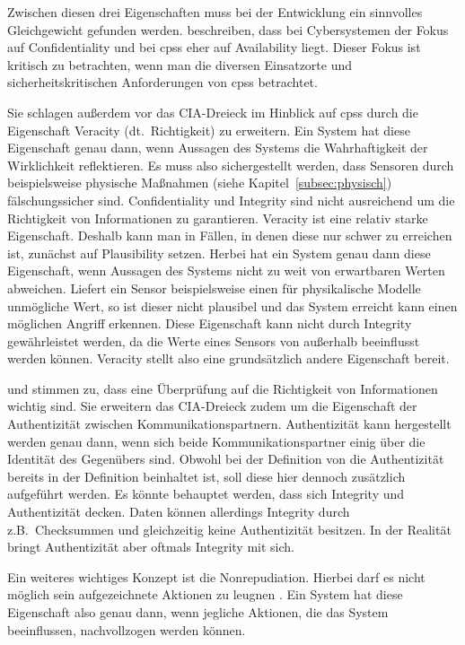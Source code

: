 \documentclass[final,bibliography=totocnumbered]{include/sikseminar}
\newcommand{\cps}{\glspl{cps}\xspace}
\begin{document}
Zwischen diesen drei Eigenschaften muss bei der Entwicklung ein sinnvolles Gleichgewicht gefunden werden.
\citeauthor{GK16} beschreiben, dass bei Cybersystemen der Fokus auf Confidentiality und bei \cps eher auf Availability liegt.
Dieser Fokus ist kritisch zu betrachten, wenn man die diversen Einsatzorte und sicherheitskritischen Anforderungen von \cps betrachtet.

Sie schlagen außerdem vor das CIA-Dreieck im Hinblick auf \cps durch die Eigenschaft Veracity (dt.~Richtigkeit) zu erweitern.
Ein System hat diese Eigenschaft genau dann, wenn Aussagen des Systems die Wahrhaftigkeit der  Wirklichkeit reflektieren.
Es muss also sichergestellt werden, dass Sensoren durch beispielsweise physische Maßnahmen (siehe Kapitel~\ref{subsec:physisch}) fälschungssicher sind.
Confidentiality und Integrity sind nicht ausreichend um die Richtigkeit von Informationen zu garantieren.
Veracity ist eine relativ starke Eigenschaft.
Deshalb kann man in Fällen, in denen diese nur schwer zu erreichen ist, zunächst auf Plausibility setzen.
Herbei hat ein System genau dann diese Eigenschaft, wenn Aussagen des Systems nicht zu weit von erwartbaren Werten abweichen.
Liefert ein Sensor beispielsweise einen für physikalische Modelle unmögliche Wert, so ist dieser nicht plausibel und das System erreicht kann einen möglichen Angriff erkennen. \cite{GK16}
Diese Eigenschaft kann nicht durch Integrity gewährleistet werden, da die Werte eines Sensors von außerhalb beeinflusst werden können.
Veracity stellt also eine grundsätzlich andere Eigenschaft bereit.

\citeauthor{WYX+10} und \citeauthor{SFJ2017} stimmen zu, dass eine Überprüfung auf die Richtigkeit von Informationen wichtig sind.
Sie erweitern das CIA-Dreieck zudem um die Eigenschaft der Authentizität zwischen Kommunikationspartnern.
Authentizität kann hergestellt werden genau dann, wenn sich beide Kommunikationspartner einig über die Identität des Gegenübers sind.\label{def:authenticity}
Obwohl bei der Definition von \citeauthor{Cherdantseva2013} die Authentizität bereits in der Definition beinhaltet ist, soll diese hier dennoch zusätzlich aufgeführt werden.
Es könnte behauptet werden, dass sich Integrity und Authentizität decken.
Daten können allerdings Integrity durch z.B.\ Checksummen und gleichzeitig keine Authentizität besitzen.
In der Realität bringt Authentizität aber oftmals Integrity mit sich.

Ein weiteres wichtiges Konzept ist die Nonrepudiation. %
Hierbei darf es nicht möglich sein aufgezeichnete Aktionen zu leugnen \cite{NIST2013}.
Ein System hat diese Eigenschaft also genau dann, wenn jegliche Aktionen, die das System beeinflussen, nachvollzogen werden können. \label{def:nonrepudiation}
\end{document}
